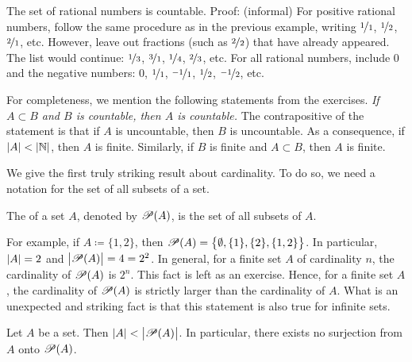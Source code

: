 \begin{example}
The set of rational numbers is countable.  Proof: (informal)
For positive rational numbers, follow the same procedure
as in the previous example, writing
$\nicefrac{1}{1}$, $\nicefrac{1}{2}$, $\nicefrac{2}{1}$, etc.  However,
leave out fractions (such as $\nicefrac{2}{2}$)
that have already appeared.  The list would continue:
$\nicefrac{1}{3}$, $\nicefrac{3}{1}$, $\nicefrac{1}{4}$,
$\nicefrac{2}{3}$, etc.
For all rational numbers, include $0$ and the negative numbers:
$0$,
$\nicefrac{1}{1}$,
$\nicefrac{-1}{1}$,
$\nicefrac{1}{2}$,
$\nicefrac{-1}{2}$, etc.
\end{example}

For completeness, we mention the following statements
from the exercises.
\emph{If $A \subset
B$ and $B$ is countable, then $A$ is countable.}  The contrapositive of the
statement is that if $A$ is
uncountable, then $B$ is uncountable.
As a consequence, if $\lvert {A} \rvert < \lvert {{\mathbb{N}}} \rvert$, then $A$ is
finite.
Similarly, if $B$ is finite and $A \subset B$, then $A$ is finite.

\pagebreak[2]
We give the first truly striking result about cardinality.
To do so, we need a notation for
the set of all subsets of a set.

\begin{defn}
The \emph{} of a set $A$, denoted by ${\mathscr{P}}(A)$,
 is the set of all subsets of $A$.
\end{defn}

For example, if $A \coloneqq \{ 1,2\}$,
then ${\mathscr{P}}(A) = \bigl\{ \emptyset, \{ 1 \}, \{ 2 \}, \{ 1, 2 \} \bigr\}$.
In particular, $\lvert {A} \rvert = 2$ and $\bigl\lvert {{\mathscr{P}}(A)} \bigr\rvert = 4 = 2^2$.
In general,
for a finite set $A$ of cardinality $n$, the
cardinality of ${\mathscr{P}}(A)$ is $2^n$.
This fact is left as an exercise.  
Hence, for a finite set $A$,
the cardinality of ${\mathscr{P}}(A)$ is strictly
larger than the
cardinality of $A$.  What is an unexpected and
striking fact is that this statement is also true for infinite sets.

\begin{thm}
\label{cantorspowersetthm}
Let $A$ be a set.  Then
$\lvert {A} \rvert < \bigl\lvert {{\mathscr{P}}(A)} \bigr\rvert$.
In particular, there exists no surjection from
$A$ onto ${\mathscr{P}}(A)$.
\end{thm}

